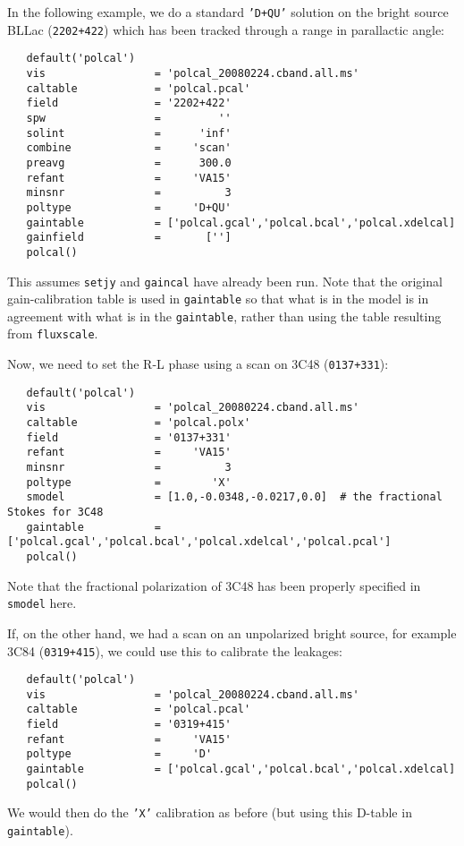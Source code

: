 In the following example, we do a standard {\tt 'D+QU'} solution on
the bright source BLLac ({\tt 2202+422}) which has been tracked
through a range in parallactic angle:
\small
\begin{verbatim}
   default('polcal')
   vis                 = 'polcal_20080224.cband.all.ms'
   caltable            = 'polcal.pcal'
   field               = '2202+422'        
   spw                 =         ''        
   solint              =      'inf'    
   combine             =     'scan' 
   preavg              =      300.0        
   refant              =     'VA15'        
   minsnr              =          3        
   poltype             =     'D+QU'        
   gaintable           = ['polcal.gcal','polcal.bcal','polcal.xdelcal]
   gainfield           =       ['']
   polcal()
\end{verbatim}
\normalsize This assumes {\tt setjy} and {\tt gaincal} have already
been run.  Note that the original gain-calibration table is used in
{\tt gaintable} so that what is in the model is in agreement with what
is in the {\tt gaintable}, rather than using the table resulting from
{\tt fluxscale}.

Now, we need to set the R-L phase using a scan on
3C48 ({\tt 0137+331}):
\small
\begin{verbatim}
   default('polcal')
   vis                 = 'polcal_20080224.cband.all.ms'
   caltable            = 'polcal.polx'
   field               = '0137+331'
   refant              =     'VA15'        
   minsnr              =          3        
   poltype             =        'X'
   smodel              = [1.0,-0.0348,-0.0217,0.0]  # the fractional Stokes for 3C48
   gaintable           = ['polcal.gcal','polcal.bcal','polcal.xdelcal','polcal.pcal']
   polcal()
\end{verbatim}
\normalsize

Note that the fractional polarization of 3C48 has been properly specified 
in {\tt smodel} here.


If, on the other hand, we had a scan on an unpolarized bright source,
for example 3C84 ({\tt 0319+415}), we could use this to calibrate the
leakages:
\small
\begin{verbatim}
   default('polcal')
   vis                 = 'polcal_20080224.cband.all.ms'
   caltable            = 'polcal.pcal'
   field               = '0319+415'
   refant              =     'VA15'        
   poltype             =     'D'        
   gaintable           = ['polcal.gcal','polcal.bcal','polcal.xdelcal]
   polcal()
\end{verbatim}
\normalsize
We would then do the {\tt 'X'} calibration as before (but using this
D-table in {\tt gaintable}).

